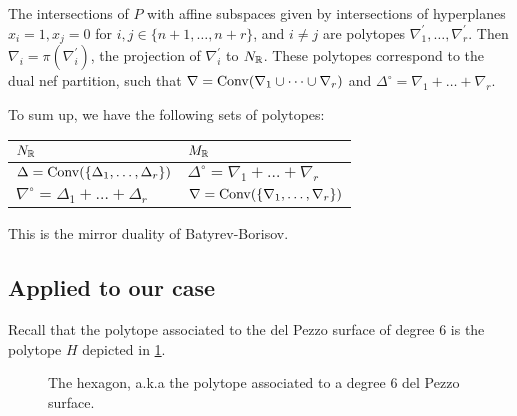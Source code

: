 \documentclass[11pt, english]{article}
\begin{document}
The intersections of $P$ with affine subspaces given by intersections of hyperplanes $x_i=1,x_j=0$ for $i,j \in \{n+1,\ldots, n+r\}$, and $i\neq j$ are polytopes $\nabla_1^\prime,\ldots, \nabla_r^\prime$. Then $\nabla_i = \pi(\nabla_i^\prime)$, the projection of $\nabla_i^\prime$ to $N_{\mathbb{R}}$. These polytopes correspond to the dual nef partition, such that $\nabla = \operatorname{Conv}(\nabla_1 \cup \cdots \cup \nabla_r)$ and $\Delta^\circ = \nabla_1 + \ldots + \nabla_r$. 

To sum up, we have the following sets of polytopes:

\begin{center}
\begin{tabular}{l l}
  $N_{\mathbb{R}}$ & $M_{\mathbb{R}}$ \\
\hline
 $\Delta=\operatorname{Conv}(\{\Delta_1,\ldots,\Delta_r\})$ & $\Delta^\circ=\nabla_1+\ldots+\nabla_r$ \\
$\nabla^\circ = \Delta_1+\ldots+\Delta_r$ & $\nabla=\operatorname{Conv}(\{\nabla_1,\ldots,\nabla_r\})$ \\

\end{tabular}
\end{center}

This is the mirror duality of Batyrev-Borisov.

\subsection{Applied to our case}

Recall that the polytope associated to the del Pezzo surface of degree $6$ is the polytope $H$ depicted in \ref{fig:hexagon}. 

\begin{figure}[ht]
\label{fig:hexagon}
\centering
{}
\caption{The hexagon, a.k.a the polytope associated to a degree 6 del Pezzo surface.}
\end{figure}
 
\end{document}
